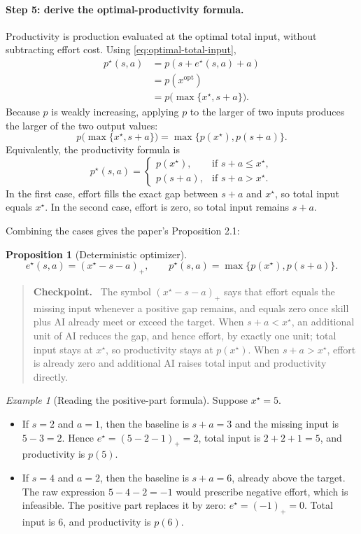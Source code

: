 \documentclass[11pt]{article}
\theoremstyle{tutorial}
\newtheorem{proposition}[theorem]{Proposition}
\theoremstyle{remark}
\newtheorem{example}[theorem]{Example}
\newenvironment{checkpoint}{\begin{quote}\color{rose}\textbf{Checkpoint.}\ }{\end{quote}}
\newcommand{\1}{\mathbb{I}}
\newcommand{\pos}[1]{\left(#1\right)_{+}}
\begin{document}
\paragraph{Step 5: derive the optimal-productivity formula.}
Productivity is production evaluated at the optimal total input, without subtracting effort cost.  Using
\eqref{eq:optimal-total-input},
\begin{align*}
p^\star(s,a)
&=p(s+e^\star(s,a)+a)\\
&=p(x^{\mathrm{opt}})\\
&=p\bigl(\max\{x^\star,s+a\}\bigr).
\end{align*}
Because $p$ is weakly increasing, applying $p$ to the larger of two inputs produces the larger of the two
output values:
\[
  p\bigl(\max\{x^\star,s+a\}\bigr)
  =\max\{p(x^\star),p(s+a)\}.
\]
Equivalently, the productivity formula is
\[
p^\star(s,a)=
\begin{cases}
p(x^\star),&\text{if }s+a\le x^\star,\\
p(s+a),&\text{if }s+a>x^\star.
\end{cases}
\]
In the first case, effort fills the exact gap between $s+a$ and $x^\star$, so total input equals
$x^\star$.  In the second case, effort is zero, so total input remains $s+a$.

Combining the cases gives the paper's Proposition 2.1:
\begin{proposition}[Deterministic optimizer]
\[
  \boxed{e^\star(s,a)=\pos{x^\star-s-a}},
  \qquad
  \boxed{p^\star(s,a)=\max\{p(x^\star),p(s+a)\}}.
\]
\end{proposition}

\begin{checkpoint}
The symbol $(x^\star-s-a)_+$ says that effort equals the missing input whenever a positive gap remains, and
equals zero once skill plus AI already meet or exceed the target.  When $s+a<x^\star$, an additional unit
of AI reduces the gap, and hence effort, by exactly one unit; total input stays at $x^\star$, so productivity
stays at $p(x^\star)$.  When $s+a>x^\star$, effort is already zero and additional AI raises total input and
productivity directly.
\end{checkpoint}

\begin{example}[Reading the positive-part formula]
Suppose $x^\star=5$.
\begin{itemize}
  \item If $s=2$ and $a=1$, then the baseline is $s+a=3$ and the missing input is $5-3=2$.  Hence
  $e^\star=(5-2-1)_+=2$, total input is $2+2+1=5$, and productivity is $p(5)$.
  \item If $s=4$ and $a=2$, then the baseline is $s+a=6$, already above the target.  The raw expression
  $5-4-2=-1$ would prescribe negative effort, which is infeasible.  The positive part replaces it by zero:
  $e^\star=(-1)_+=0$.  Total input is $6$, and productivity is $p(6)$.
\end{itemize}
\end{example}
\end{document}
